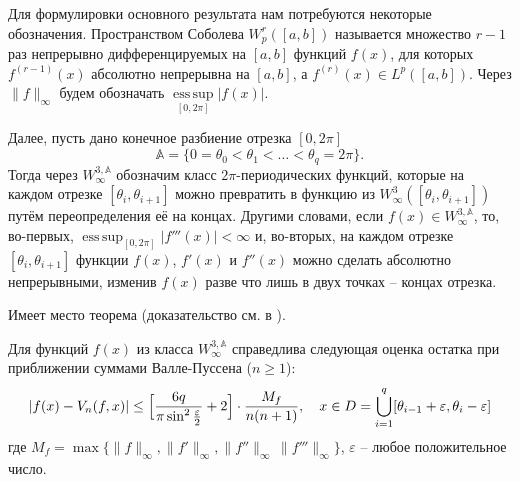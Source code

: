 Для формулировки основного результата нам потребуются некоторые обозначения.
Пространством Соболева $W_p^r([a,b])$ называется множество $r-1$ раз непрерывно дифференцируемых на $[a,b]$ функций $f(x)$, для которых $f^{(r-1)}(x)$ абсолютно непрерывна на $[a,b]$, а $f^{(r)}(x)\in L^p([a,b])$.
Через $\|f\|_\infty$ будем обозначать $\operatorname*{ess\,sup}\limits_{[0,2\pi]}|f(x)|$.

\noindent Далее, пусть дано конечное разбиение отрезка $[0,2\pi]$
$$
    \mathds{A} = \{0=\theta_0<\theta_1<\ldots<\theta_q=2\pi\}.
$$
Тогда через $W_\infty^{3,\mathds{A}}$ обозначим класс $2\pi$-периодических функций, которые на каждом отрезке $[\theta_i,\theta_{i+1}]$ можно превратить в функцию из $W_\infty^3([\theta_i,\theta_{i+1}])$ путём переопределения её на концах. Другими словами, если $f(x) \in W_\infty^{3,\mathds{A}}$, то, во-первых, $\operatorname*{ess\,sup}_{[0,2\pi]}|f'''(x)| < \infty$ и, во-вторых, на каждом отрезке $[\theta_i,\theta_{i+1}]$ функции $f(x)$, $f'(x)$ и $f''(x)$ можно сделать абсолютно непрерывными, изменив $f(x)$ разве что лишь в двух точках -- концах отрезка.

\noindent Имеет место теорема (доказательство см. в \cite{mmg-classic-vallee-pussen}).
\begin{theorem}
Для функций $f(x)$ из класса $W_\infty^{3,\mathds{A}}$ справедлива следующая оценка остатка при приближении суммами Валле-Пуссена ($n \ge 1$):
\vspace{-3mm}
$$
|f(x)-V_n(f,x)| \leq
\Bigl[
\frac{6q}{\pi \sin^2\frac{\varepsilon}{2}}+2
\Bigr] \cdot
\frac{M_f}{n(n+1)}, \quad
x \in D = \bigcup\limits_{i=1}^{q}[\theta_{i-1}+\varepsilon,\theta_{i}-\varepsilon]
$$
где $M_f=\max\{\|f\|_\infty,\|f'\|_\infty,\|f''\|_\infty\,\|f'''\|_\infty\}$, $\varepsilon$ -- любое положительное число.
\end{theorem}
